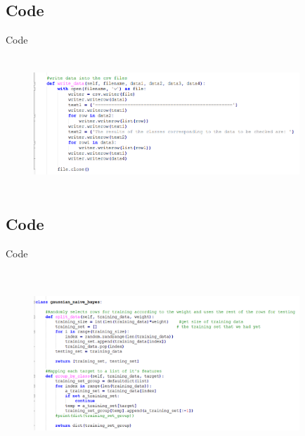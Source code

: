 \documentclass{beamer}
\begin{document}
\subsection{Code}
    \begin{frame}{Code}
        \begin{center}
            \begin{figure}
                \begin{center}
                    \includegraphics[width = 10cm, height = 5cm]{Theme/images/write.PNG}
                \end{center}
            \end{figure}
        \end{center}
    \end{frame}

\subsection{Code}
    \begin{frame}{Code}
        \begin{center}
            \begin{figure}
                \begin{center}
                     \includegraphics[width = 10cm, height = 7cm]{Theme/images/gaussian1.PNG}
                \end{center}
            \end{figure}
        \end{center}
    \end{frame}
\end{document}
